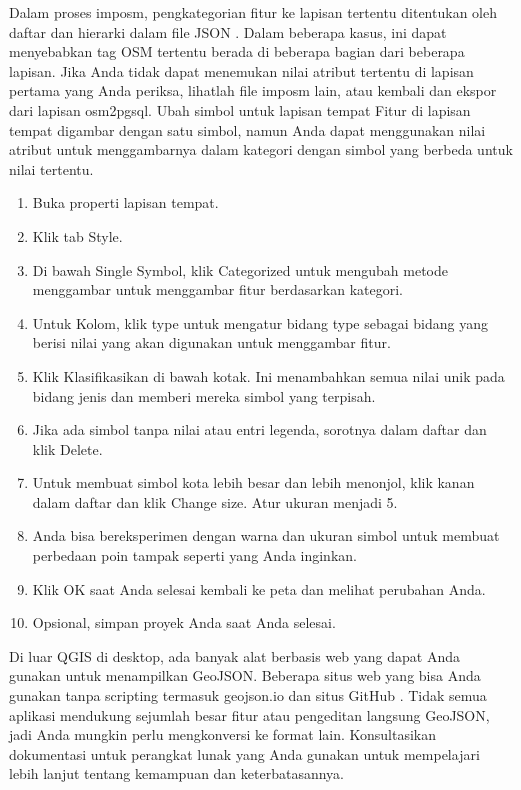 Dalam proses imposm, pengkategorian fitur ke lapisan tertentu ditentukan oleh daftar dan hierarki dalam file JSON . Dalam beberapa kasus, ini dapat menyebabkan tag OSM tertentu berada di beberapa bagian dari beberapa lapisan. Jika Anda tidak dapat menemukan nilai atribut tertentu di lapisan pertama yang Anda periksa, lihatlah file imposm lain, atau kembali dan ekspor dari lapisan osm2pgsql.
Ubah simbol untuk lapisan tempat
Fitur di lapisan tempat digambar dengan satu simbol, namun Anda dapat menggunakan nilai atribut untuk menggambarnya dalam kategori dengan simbol yang berbeda untuk nilai tertentu.
\begin{enumerate}
\item
Buka properti lapisan tempat.
\item
Klik tab Style.
\item
Di bawah Single Symbol, klik Categorized untuk mengubah metode menggambar untuk menggambar fitur berdasarkan kategori.
\item
Untuk Kolom, klik type untuk mengatur bidang type sebagai bidang yang berisi nilai yang akan digunakan untuk menggambar fitur.
\item
Klik Klasifikasikan di bawah kotak. Ini menambahkan semua nilai unik pada bidang jenis dan memberi mereka simbol yang terpisah.
\item
Jika ada simbol tanpa nilai atau entri legenda, sorotnya dalam daftar dan klik Delete.
\item
Untuk membuat simbol kota lebih besar dan lebih menonjol, klik kanan dalam daftar dan klik Change size. Atur ukuran menjadi 5.
\item
Anda bisa bereksperimen dengan warna dan ukuran simbol untuk membuat perbedaan poin tampak seperti yang Anda inginkan.
\item
Klik OK saat Anda selesai kembali ke peta dan melihat perubahan Anda.
\item
Opsional, simpan proyek Anda saat Anda selesai.
\end{enumerate}

Di luar QGIS di desktop, ada banyak alat berbasis web yang dapat Anda gunakan untuk menampilkan GeoJSON. Beberapa situs web yang bisa Anda gunakan tanpa scripting termasuk geojson.io dan situs GitHub . Tidak semua aplikasi mendukung sejumlah besar fitur atau pengeditan langsung GeoJSON, jadi Anda mungkin perlu mengkonversi ke format lain. Konsultasikan dokumentasi untuk perangkat lunak yang Anda gunakan untuk mempelajari lebih lanjut tentang kemampuan dan keterbatasannya.

